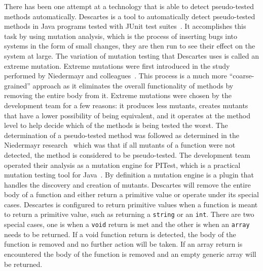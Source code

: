 There has been one attempt at a technology that is able to detect pseudo-tested methods automatically. Descartes is a tool to automatically detect pseudo-tested methods in Java programs tested with JUnit test suites~\cite{vera2018descartes}. It accomplishes this task by using mutation analysis, which is the process of inserting bugs into systems in the form of small changes, they are then run to see their effect on the system at large. The variation of mutation testing that Descartes uses is called an extreme mutation. Extreme mutations were first introduced in the study performed by Niedermayr and colleagues~\cite{niedermayr2016will}. This process is a much more ``coarse-grained'' approach as it eliminates the overall functionality of methods by removing the entire body from it. Extreme mutations were chosen by the development team for a few reasons: it produces less mutants, creates mutants that have a lower possibility of being equivalent, and it operates at the method level to help decide which of the methods is being tested the worst. The determination of a pseudo-tested method was followed as determined in the Niedermayr research~\cite{niedermayr2016will} which was that if all mutants of a function were not detected, the method is considered to be pseudo-tested. The development team operated their analysis as a mutation engine for PITest, which is a practical mutation testing tool for Java~\cite{coles2016pit}. By definition a mutation engine is a plugin that handles the discovery and creation of mutants. Descartes will remove the entire body of a function and either return a primitive value or operate under its special cases. Descartes is configured to return primitive values when a function is meant to return a primitive value, such as returning a \texttt{string} or an \texttt{int}. There are two special cases, one is when a \texttt{void} return is met and the other is when an \texttt{array} needs to be returned. If a void function return is detected, the body of the function is removed and no further action will be taken. If an array return is encountered the body of the function is removed and an empty generic array will be returned.

